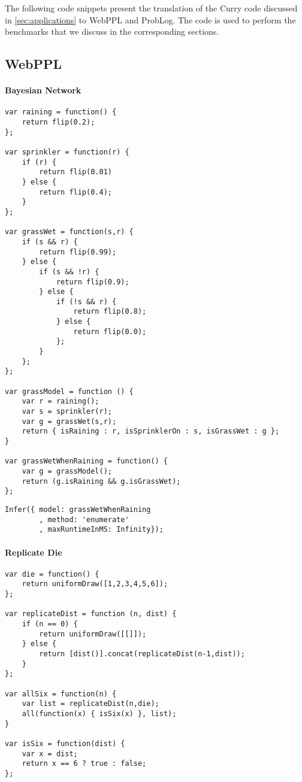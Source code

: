 The following code snippets present the translation of the Curry code discussed in \autoref{sec:applications} to WebPPL and ProbLog.
The code is used to perform the benchmarks that we discuss in the corresponding sections.

\subsection{WebPPL}

\paragraph{Bayesian Network}
\begin{verbatim}
var raining = function() {
    return flip(0.2);
};

var sprinkler = function(r) {
    if (r) {
        return flip(0.01)
    } else {
        return flip(0.4);
    }
};

var grassWet = function(s,r) {
    if (s && r) {
        return flip(0.99);
    } else {
        if (s && !r) {
            return flip(0.9);
        } else {
            if (!s && r) {
                return flip(0.8);
            } else {
                return flip(0.0);
            };
        }
    };
};

var grassModel = function () {
    var r = raining();
    var s = sprinkler(r);
    var g = grassWet(s,r);
    return { isRaining : r, isSprinklerOn : s, isGrassWet : g };
}

var grassWetWhenRaining = function() {
    var g = grassModel();
    return (g.isRaining && g.isGrassWet);
};

\end{verbatim}

\begin{verbatim}
Infer({ model: grassWetWhenRaining
        , method: 'enumerate'
        , maxRuntimeInMS: Infinity});
\end{verbatim}

\paragraph{Replicate Die}

\begin{verbatim}
var die = function() {
    return uniformDraw([1,2,3,4,5,6]);
};

var replicateDist = function (n, dist) {
    if (n == 0) {
        return uniformDraw([[]]);
    } else {
        return [dist()].concat(replicateDist(n-1,dist));
    }
};

var allSix = function(n) {
    var list = replicateDist(n,die);
    all(function(x) { isSix(x) }, list);
}

var isSix = function(dist) {
    var x = dist;
    return x == 6 ? true : false;
};

\end{verbatim}

